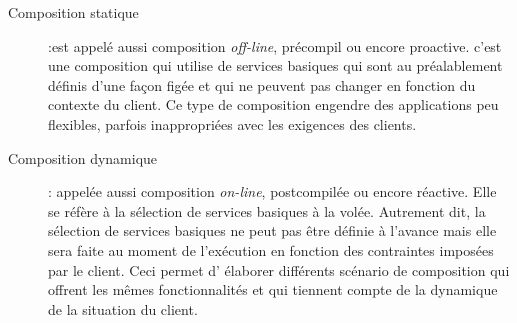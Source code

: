       \renewcommand{\descriptionlabel}[1]{\hspace{1cm}\textbullet~\textsf{#1}}
      \begin{description}
      \item[Composition statique] :est appelé aussi composition
        \textit{off-line}, précompil ou encore proactive. c'est une
        composition qui utilise de services basiques qui sont au
        préalablement définis d'une façon figée et qui ne peuvent pas
        changer en fonction du contexte du client. Ce type de
        composition engendre des applications peu flexibles, parfois
        inappropriées avec les exigences des clients.


      \item[Composition dynamique]: appelée aussi composition
        \textit{on-line}, postcompilée ou encore réactive. Elle se
        réfère à la sélection de services basiques à la
        volée. Autrement dit, la sélection de services basiques ne
        peut pas être définie à l'avance mais elle sera faite au
        moment de l'exécution en fonction des contraintes imposées par
        le client. Ceci permet d' élaborer différents scénario de
        composition qui offrent les mêmes fonctionnalités et qui
        tiennent compte de la dynamique de la situation du client.


\end{description}

